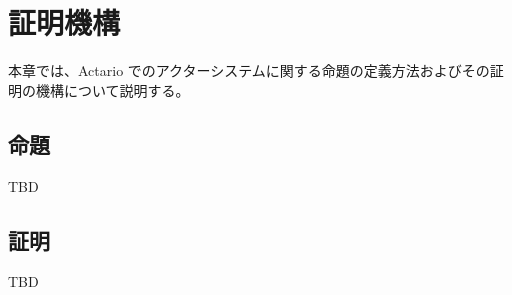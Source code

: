 \chapter{証明機構}

本章では、Actario でのアクターシステムに関する命題の定義方法およびその証明の機構について説明する。

\section{命題}

TBD

\section{証明}

TBD
